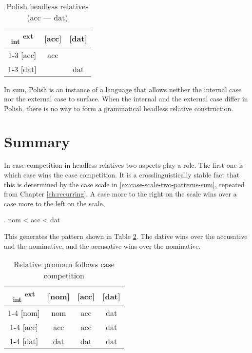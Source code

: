 \begin{table}[H]
  \center
  \caption{Polish headless relatives (\ac{acc} --- \ac{dat})}
  \begin{tabular}{c|c|c}
    \toprule
    \textsubscript{\ac{int}} \textsuperscript{\ac{ext}}
           & [\ac{acc}]
           & [\ac{dat}]
           \\ \cmidrule{1-3}
       [\ac{acc}]
           & \ac{acc}
           & \cellcolor{DG}{*}
           \\ \cmidrule{1-3}
       [\ac{dat}]
           & \cellcolor{LG}{*}
           & \ac{dat}
           \\
     \bottomrule
  \end{tabular}
    \label{tbl:summary-polish-acc-dat}
\end{table}

In sum, Polish is an instance of a language that allows neither the internal case nor the external case to surface. When the internal and the external case differ in Polish, there is no way to form a grammatical headless relative construction.

\section{Summary}\label{sec:summary-3-patterns}

In case competition in headless relatives two aspects play a role. The first one is which case wins the case competition. It is a crosslinguistically stable fact that this is determined by the case scale in \ref{ex:case-scale-two-patterns-sum}, repeated from Chapter \ref{ch:recurring}. A case more to the right on the scale wins over a case more to the left on the scale.

\ex. \ac{nom} < \ac{acc} < \ac{dat}\label{ex:case-scale-two-patterns-sum}

This generates the pattern shown in Table \ref{tbl:case-competition-table}. The dative wins over the accusative and the nominative, and the accusative wins over the nominative.

\begin{table}[H]
  \center
  \caption{Relative pronoun follows case competition}
  \begin{tabular}{c|c|c|c}
    \toprule
    \textsubscript{\ac{int}} \textsuperscript{\ac{ext}}
           & [\ac{nom}]
           & [\ac{acc}]
           & [\ac{dat}]
           \\ \cmidrule{1-4}
       [\ac{nom}]
           & \ac{nom}
           & \cellcolor{DG}\ac{acc}
           & \cellcolor{DG}\ac{dat}
           \\ \cmidrule{1-4}
       [\ac{acc}]
           & \cellcolor{LG}\ac{acc}
           & \ac{acc}
           & \cellcolor{DG}\ac{dat}
           \\ \cmidrule{1-4}
       [\ac{dat}]
           & \cellcolor{LG}\ac{dat}
           & \cellcolor{LG}\ac{dat}
           & \ac{dat}
           \\
     \bottomrule
  \end{tabular}
    \label{tbl:case-competition-table}
\end{table}

